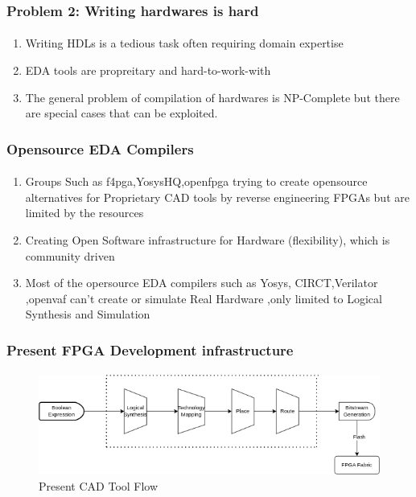 \documentclass{beamer}
\begin{document}
\begin{frame}[fragile]
  \frametitle{Problem 2: Writing hardwares is hard}
  \framesubtitle{}
  \begin{enumerate}
    \item Writing HDLs is a tedious task often requiring domain expertise
    \item EDA tools are propreitary and hard-to-work-with
    \item The general problem of compilation of hardwares is NP-Complete but
      there are special cases that can be exploited.
  \end{enumerate}
\end{frame}


\begin{frame}[fragile]
  \frametitle{Opensource EDA Compilers}
  \framesubtitle{}
  \begin{enumerate}
        \item Groups Such as f4pga,YosysHQ,openfpga trying to create opensource alternatives for Proprietary CAD tools by reverse engineering FPGAs but are limited by the resources 
         \item Creating Open Software infrastructure for Hardware (flexibility), which is community driven 
        \item Most of the opersource EDA compilers such as Yosys, CIRCT,Verilator ,openvaf   can't create or simulate  Real Hardware ,only limited to Logical Synthesis and Simulation
    \end{enumerate}
   
\end{frame}

\begin{frame}[fragile]
  \frametitle{Present FPGA Development infrastructure}
  \framesubtitle{}
   \begin{figure}
        \centering
        \includegraphics[width=1\linewidth]{slides/images/cad_flow_fl.png}
        \caption{Present CAD Tool Flow }
        \label{exa_cadflow}
    \end{figure}
   
\end{frame}
\end{document}
